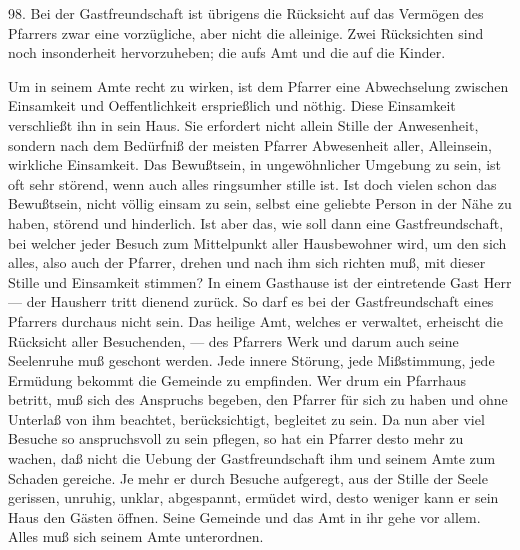 98. Bei der Gastfreundschaft ist übrigens die Rücksicht auf das Vermögen des Pfarrers zwar eine vorzügliche, aber nicht die alleinige. Zwei Rücksichten sind noch insonderheit hervorzuheben; die aufs Amt und die auf die Kinder.

Um in seinem Amte recht zu wirken, ist dem Pfarrer eine Abwechselung zwischen Einsamkeit und Oeffentlichkeit ersprießlich und nöthig. Diese Einsamkeit verschließt ihn in sein Haus. Sie erfordert nicht allein Stille der Anwesenheit, sondern nach dem Bedürfniß der meisten Pfarrer Abwesenheit aller, Alleinsein, wirkliche Einsamkeit. Das Bewußtsein, in ungewöhnlicher Umgebung zu sein, ist oft sehr störend, wenn auch alles ringsumher stille ist. Ist doch vielen schon das Bewußtsein, nicht völlig einsam zu sein,
selbst eine geliebte Person in der Nähe zu haben, störend und hinderlich. Ist aber das, wie soll dann eine Gastfreundschaft, bei welcher jeder Besuch zum Mittelpunkt aller Hausbewohner wird, um den sich alles, also auch der Pfarrer, drehen und nach ihm sich richten muß, mit dieser Stille und Einsamkeit stimmen? In einem Gasthause ist der eintretende Gast Herr — der Hausherr tritt dienend zurück. So darf es bei der Gastfreundschaft eines Pfarrers durchaus nicht sein. Das heilige Amt, welches er verwaltet, erheischt die Rücksicht aller Besuchenden, — des Pfarrers Werk und darum auch seine Seelenruhe muß geschont werden. Jede innere Störung, jede Mißstimmung, jede Ermüdung bekommt die Gemeinde zu empfinden. Wer drum ein Pfarrhaus betritt, muß sich des Anspruchs begeben, den Pfarrer für sich zu haben und ohne Unterlaß von ihm beachtet, berücksichtigt, begleitet zu sein. Da nun aber viel Besuche so anspruchsvoll zu sein pflegen, so hat ein Pfarrer desto mehr zu wachen, daß nicht die Uebung der Gastfreundschaft ihm und seinem Amte zum Schaden gereiche. Je mehr er durch Besuche aufgeregt, aus der Stille der Seele gerissen, unruhig, unklar, abgespannt, ermüdet wird, desto weniger kann er sein Haus den Gästen öffnen. Seine Gemeinde und das Amt in ihr gehe vor allem. Alles muß sich seinem Amte unterordnen.

